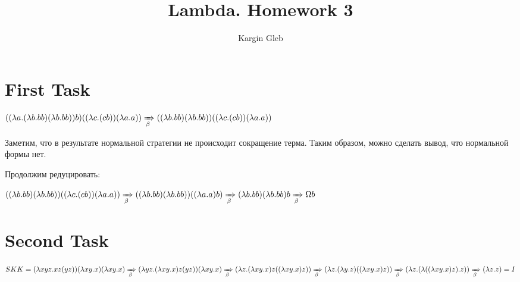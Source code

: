 \documentclass{article}
\title{Lambda. Homework 3}
\author{Kargin Gleb}
\date{}
\begin{document}
    \maketitle


    \section{First Task}
    $
    ((\lambda a.(\lambda b.b b) (\lambda b.b b)) b) ((\lambda c.(c b)) (\lambda a.a)) \xRightarrow[\beta]{} ((\lambda b.b b) (\lambda b.b b)) ((\lambda c.(c b)) (\lambda a.a))
    $

    Заметим, что в результате нормальной стратегии не происходит сокращение терма. Таким образом, можно сделать вывод, что нормальной формы нет.

    Продолжим редуцировать:

    $
    ((\lambda b.b b) (\lambda b.b b)) ((\lambda c.(c b)) (\lambda a.a))
    \xRightarrow[\beta]{} ((\lambda b.b b) (\lambda b.b b)) ((\lambda a.a) b) \xRightarrow[\beta]{} (\lambda b.b b) (\lambda b.b b) b
    \xRightarrow[\beta]{} \Omega b
    $


    \section{Second Task}
    \sloppy
    $
    S K K = (\lambda x y z.x z (y z)) (\lambda x y.x) (\lambda x y.x) \xRightarrow[\beta]{} (\lambda y z.(\lambda x y.x) z (y z)) (\lambda x y.x) \xRightarrow[\beta]{} (\lambda z. (\lambda x y.x) z ((\lambda x y.x)z))
    \xRightarrow[\beta]{} (\lambda z. (\lambda y.z) ((\lambda x y.x)z))
    \xRightarrow[\beta]{} (\lambda z. (\lambda ((\lambda x y.x)z).z) )
    \xRightarrow[\beta]{} (\lambda z. z) = I
    $
\end{document}
